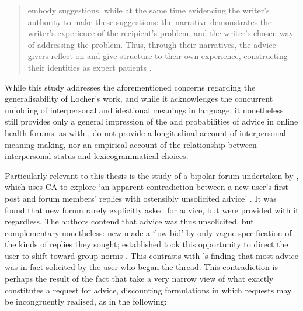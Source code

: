 \begin{quote}\small{} embody suggestions, while at the same time evidencing the writer's authority to make these suggestions: the narrative demonstrates the writer's experience of the recipient's problem, and the writer's chosen way of addressing the problem. Thus, through their narratives, the advice givers reflect on and give structure to their own experience, constructing their identities as expert patients \cite[p.~107]{harrison2009politeness}.
\end{quote}
%
While this study addresses the aforementioned concerns regarding the generalisability of Locher's work, and while it acknowledges the concurrent unfolding of interpersonal and ideational meanings in language, it nonetheless still provides only a general impression of the  and  probabilities of advice in online health \glspl{forum}: as with \textcite{locher2006advice}, \citeauthor{harrison2009politeness} do not provide a longitudinal account of interpersonal meaning\hyp{}making, nor an empirical account of the relationship between interpersonal status and lexicogrammatical choices.

Particularly relevant to this thesis is the study of a \gls{bipolar} \gls{forum} undertaken by \citeauthor{vayreda_social_2009}, which uses \gls{CA} to explore `an apparent contradiction between a new user's first post and \gls{forum} members' replies with ostensibly unsolicited advice' \parencite*[p.~931]{vayreda_social_2009}. It was found that new forum  rarely explicitly asked for advice, but were provided with it regardless. The authors contend that advice was thus unsolicited, but complementary nonetheless: new  made a `low bid' by only vague specification of the kinds of replies they sought; established  took this opportunity to direct the user to shift toward group norms \parencite*[p.~940]{vayreda_social_2009}. This contrasts with \citeauthor{kouper_pragmatics_2010}'s finding that most advice was in fact solicited by the user who began the \gls{thread}. This contradiction is perhaps the result of the fact that \citeauthor{vayreda_social_2009} take a very narrow view of what exactly constitutes a request for advice, discounting formulations in which requests may be incongruently realised, as in the following:

